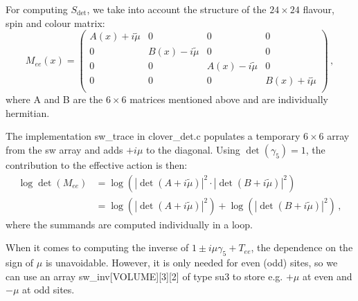 For computing $S_\mathrm{det}$, we take into account the structure
of the $24 \times 24$ flavour, spin and colour matrix:
\begin{equation}
	\label{eq:cloverMee}
	M_{ee}(x) = 
		\begin{pmatrix}
		  A(x) + i\tilde{\mu} & 0 & 0 & 0 \\
		  0 & B(x) - i\tilde{\mu} & 0 & 0 \\
		  0 & 0 & A(x) - i\tilde{\mu} & 0 \\
		  0 & 0 & 0 & B(x) + i\tilde{\mu} \\
		\end{pmatrix}\, ,
\end{equation}
where A and B are the $6 \times 6$ matrices mentioned above and are individually hermitian. 

The implementation {\ttfamily sw\_trace} in {\ttfamily clover\_det.c} populates a temporary $6\times6$ array 
from the {\ttfamily sw} array and adds $+i\mu$ to the diagonal. Using $\det(\gamma_5) = 1$, 
the contribution to the effective action is then:
\begin{equation}
	\label{eq:cloverdet}
	\begin{aligned}
		\log \det(M_{ee}) &= \log\left( |\det( A + i\tilde{\mu} )|^2 \cdot |\det( B + i\tilde{\mu} )|^2 \right) \\
		& = \log\left( |\det( A + i\tilde{\mu} )|^2 \right) + \log \left( |\det( B + i\tilde{\mu} )|^2 \right)\,,
	\end{aligned}
\end{equation}
where the summands are computed individually in a loop.

When it comes to computing the inverse of $1\pm i \mu\gamma_5 +
T_{ee}$, the dependence on the sign of $\mu$ is unavoidable. However,
it is only needed for even (odd) sites, so we can use an array
{\ttfamily sw\_inv[VOLUME][3][2]} of type {\ttfamily su3} to store
e.g. $+\mu$ at even and $-\mu$ at odd sites.

